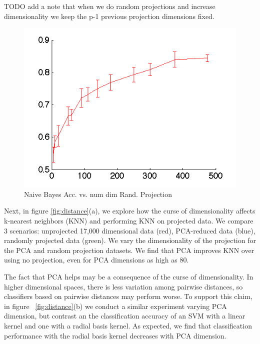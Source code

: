 \documentclass[]{article}
\begin{document}
TODO add a note that when we do random projections and increase dimensionality we keep the p-1 previous projection dimensions fixed. 

\begin{center}
\begin{figure}[!ht]
\centering
\includegraphics[width=.5\textwidth]{../images/accuracy_vs_dim_randproj.png}
\caption{Naive Bayes Acc. vs. num dim Rand. Projection}
\label{fig:nb_rand_proj}
\end{figure}
\end{center}


	Next, in figure \ref{fig:distance}(a), we explore how the curse of dimensionality affects k-nearest neighbors (KNN) and performing KNN on projected data. We compare 3 scenarios: unprojected 17,000 dimensional data (red), PCA-reduced data (blue), randomly projected data (green). We vary the dimensionality of the projection for the PCA and random projection datasets. We find that  PCA improves KNN over using no projection, even for PCA dimensions as high as 80. 

	The fact that PCA helps may be a consequence of the curse of dimensionality. In higher dimensional spaces, there is less variation among pairwise distances, so classifiers based on pairwise distances may perform worse. To support this claim, in figure ~\ref{fig:distance}(b) we conduct a similar experiment varying PCA dimension, but contrast an the classification accuracy of an SVM with a linear kernel and one with a radial basis kernel. As expected, we find that classification performance with the radial basis kernel decreases with PCA dimension. 
\end{document}

